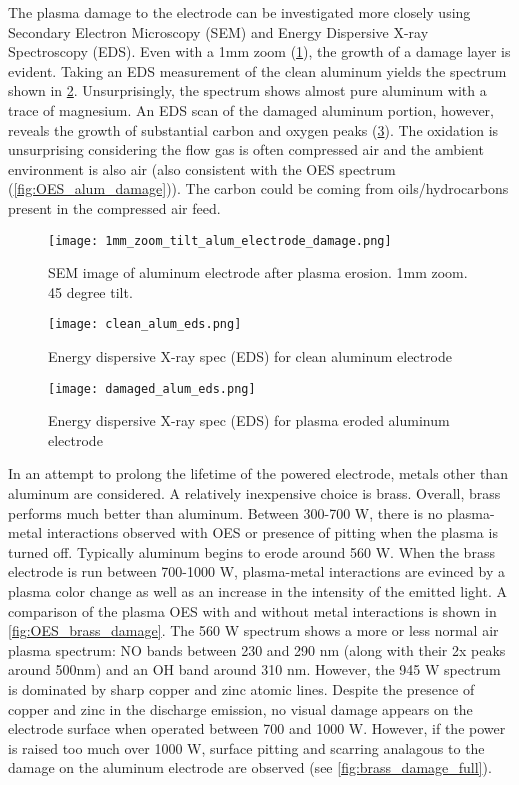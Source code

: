 The plasma damage to the electrode can be investigated more closely using Secondary Electron Microscopy (SEM) and Energy Dispersive X-ray Spectroscopy (EDS). Even with a 1mm zoom (\cref{fig:alum_damage_1mm}), the growth of a damage layer is evident. Taking an EDS measurement of the clean aluminum yields the spectrum shown in \cref{fig:EDS_clean_alum}. Unsurprisingly, the spectrum shows almost pure aluminum with a trace of magnesium. An EDS scan of the damaged aluminum portion, however, reveals the growth of substantial carbon and oxygen peaks (\cref{fig:EDS_damaged_alum}). The oxidation is unsurprising considering the flow gas is often compressed air and the ambient environment is also air (also consistent with the OES spectrum (\cref{fig:OES_alum_damage})). The carbon could be coming from oils/hydrocarbons present in the compressed air feed.

\begin{figure}[htbp]
  \centering
  \texttt{[image: 1mm\_zoom\_tilt\_alum\_electrode\_damage.png]}
  \caption{SEM image of aluminum electrode after plasma erosion. 1mm zoom. 45 degree tilt.}
  \label{fig:alum_damage_1mm}
\end{figure}

\begin{figure}[htbp]
  \centering
  \texttt{[image: clean\_alum\_eds.png]}
  \caption{Energy dispersive X-ray spec (EDS) for clean aluminum electrode}
  \label{fig:EDS_clean_alum}
\end{figure}

\begin{figure}[htbp]
  \centering
  \texttt{[image: damaged\_alum\_eds.png]}
  \caption{Energy dispersive X-ray spec (EDS) for plasma eroded aluminum electrode}
  \label{fig:EDS_damaged_alum}
\end{figure}

In an attempt to prolong the lifetime of the powered electrode, metals other than aluminum are considered. A relatively inexpensive choice is brass. Overall, brass performs much better than aluminum. Between 300-700 W, there is no plasma-metal interactions observed with OES or presence of pitting when the plasma is turned off. Typically aluminum begins to erode around 560 W. When the brass electrode is run between 700-1000 W, plasma-metal interactions are evinced by a plasma color change as well as an increase in the intensity of the emitted light. A comparison of the plasma OES with and without metal interactions is shown in \cref{fig:OES_brass_damage}. The 560 W spectrum shows a more or less normal air plasma spectrum: NO bands between 230 and 290 nm (along with their 2x peaks around 500nm) and an OH band around 310 nm. However, the 945 W spectrum is dominated by sharp copper and zinc atomic lines. Despite the presence of copper and zinc in the discharge emission, no visual damage appears on the electrode surface when operated between 700 and 1000 W. However, if the power is raised too much over 1000 W, surface pitting and scarring analagous to the damage on the aluminum electrode are observed (see \cref{fig:brass_damage_full}).

